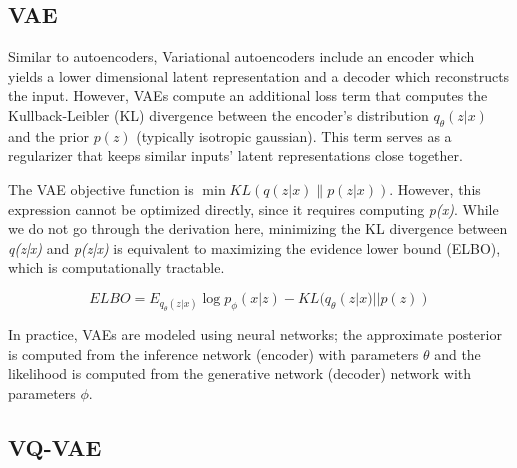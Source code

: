 \documentclass{article}
\begin{document}
\subsection{VAE}

Similar to autoencoders, Variational autoencoders include an encoder which yields a lower dimensional latent representation and a decoder which reconstructs the input. However, VAEs compute an additional loss term that computes the Kullback-Leibler (KL) divergence between the encoder’s distribution \(q_{\theta}(z|x)\) and the prior \(p(z)\) (typically isotropic gaussian). This term serves as a regularizer that keeps similar inputs’ latent representations close together.


The VAE objective function is $\min{KL(q(z|x) \| p(z|x))}$. However, this expression cannot be optimized directly, since it requires computing \textit{p(x)}. While we do not go through the derivation here, minimizing the KL divergence between \textit{q(z|x)} and \textit{p(z|x)} is equivalent to maximizing the evidence lower bound (ELBO), which is computationally tractable. 

\begin{equation}
ELBO = E_{q_{\theta}(z|x)} \log{p_{\phi}(x|z)} - KL(q_{\theta}(z|x)||p(z))
\end{equation}

In practice, VAEs are modeled using neural networks; the approximate posterior is computed from the inference network (encoder) with parameters \(\theta\) and the likelihood is computed from the generative network (decoder) network with parameters \(\phi\). 

\subsection{VQ-VAE}
\end{document}
